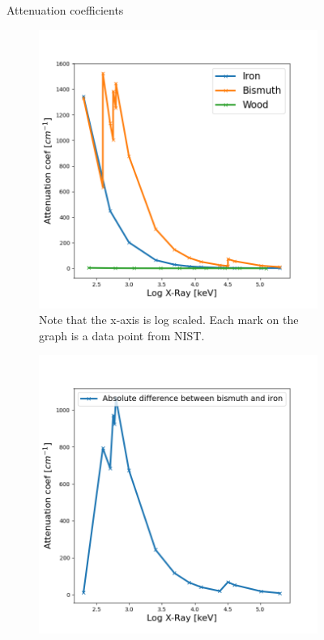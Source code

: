 \documentclass{article}
\begin{document}
\begin{figure}[H]
    \centering
    \large{Attenuation coefficients} \\
    \begin{subfigure}[b]{0.49\textwidth}
        \centering
        \includegraphics[scale=0.4]{images/attenuation_coef_zoom.png}
        \caption{\small Note that the x-axis is log scaled. Each mark on the graph is a data point from NIST. \newline}
        \label{fig:attenuation-coef-zoom}
    \end{subfigure}
    \begin{subfigure}[b]{0.49\textwidth}
        \centering
        \includegraphics[scale=0.4]{images/diff-attenuation-coef-bismuth-iron-zoom.png}

\end{subfigure}
\end{figure}
\end{document}

